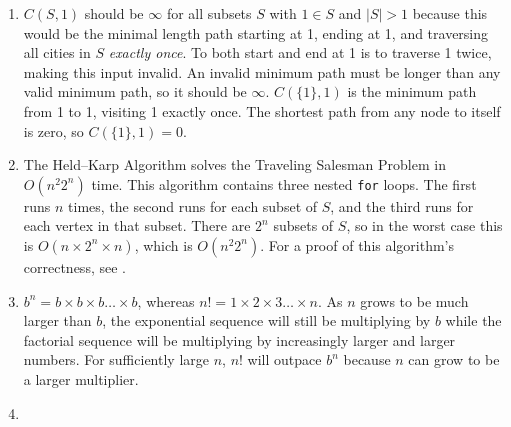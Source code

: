 \documentclass[a4paper, 10pt]{article}
\begin{document}
\begin{enumerate}
\begin{enumerate}

			\item $C(S, 1)$ should be $\infty$ for all subsets $S$ with $1 \in
				S$ and $|S| > 1$ because this would be the minimal length path
				starting at 1, ending at 1, and traversing all cities in $S$
				\textit{exactly once}. To both start and end at 1 is to traverse
				1 twice, making this input invalid. An invalid minimum path must
				be longer than any valid minimum path, so it should be $\infty$.
				$C(\{ 1 \}, 1)$ is the minimum path from 1 to 1, visiting 1
				exactly once. The shortest path from any node to itself is zero,
				so $C(\{ 1 \}, 1) = 0$.

			\item The Held--Karp Algorithm solves the Traveling Salesman Problem
				in $O(n^2 2^n)$ time. This algorithm contains three nested
				\texttt{for} loops. The first runs $n$ times, the second runs
				for each subset of $S$, and the third runs for each vertex in
				that subset. There are $2^n$ subsets of $S$, so in the worst
				case this is $O(n \times 2^n \times n)$, which is $O(n^2 2^n)$.
				For a proof of this algorithm's correctness, see
				\cite{held1962dynamic}.

			\item $b^n = b \times b \times b \dots \times b$, whereas $n! = 1
				\times 2 \times 3 \dots \times n$. As $n$ grows to be much
				larger than $b$, the exponential sequence will still be
				multiplying by $b$ while the factorial sequence will be
				multiplying by increasingly larger and larger numbers. For
				sufficiently large $n$, $n!$ will outpace $b^n$ because $n$ can
				grow to be a larger multiplier.

			\item %
		\end{enumerate}
\end{enumerate}

\printbibliography
\end{document}
